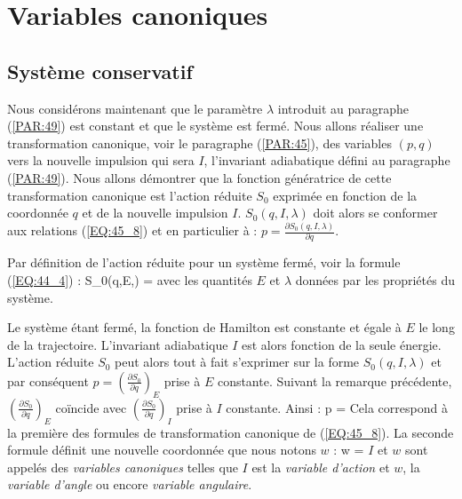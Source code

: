\section{Variables canoniques}\label{PAR:50}

\subsection{Syst\`{e}me conservatif}\label{PAR:50_1}

Nous consid\'{e}rons maintenant que le param\`{e}tre $\lambda$ introduit au paragraphe (\ref{PAR:49}) est constant et que le syst\`{e}me est ferm\'{e}. Nous allons r\'{e}aliser une transformation canonique, voir le paragraphe (\ref{PAR:45}), des variables $(p,q)$ vers la nouvelle impulsion qui sera $I$, l'invariant adiabatique d\'{e}fini au paragraphe (\ref{PAR:49}). Nous allons d\'{e}montrer que la fonction g\'{e}n\'{e}ratrice de cette transformation canonique est l'action r\'{e}duite $S_{0}$ exprim\'{e}e en fonction de la coordonn\'{e}e $q$ et de la nouvelle impulsion $I$. $S_{0}(q,I,\lambda)$ doit alors se conformer aux relations (\ref{EQ:45_8}) et en particulier \`{a} : $p = \frac{\partial S_{0}(q,I,\lambda)}{\partial q}$.

Par d\'{e}finition de l'action r\'{e}duite pour un syst\`{e}me ferm\'{e}, voir la formule (\ref{EQ:44_4}) :
\be
	S_{0}(q,E,\lambda) =  \label{EQ:50_1}
\ee
avec les quantit\'{e}s $E$ et $\lambda$ donn\'{e}es par les propri\'{e}t\'{e}s du syst\`{e}me.

Le syst\`{e}me \'{e}tant ferm\'{e}, la fonction de Hamilton est constante et \'{e}gale \`{a} $E$ le long de la trajectoire. L'invariant adiabatique $I$ est alors fonction de la seule \'{e}nergie. L'action r\'{e}duite $S_{0}$ peut alors tout \`{a} fait s'exprimer sur la forme $S_{0}(q,I,\lambda)$ et par cons\'{e}quent $p = \left(\frac{\partial S_{0}}{\partial q}\right)_{E}$ prise \`{a} $E$ constante. Suivant la remarque pr\'{e}c\'{e}dente, $\left(\frac{\partial S_{0}}{\partial q}\right)_{E}$ co\"{i}ncide avec $\left(\frac{\partial S_{0}}{\partial q}\right)_{I}$ prise \`{a} $I$ constante. Ainsi :
\be
	p =  \label{EQ:50_2}
\ee
Cela correspond \`{a} la premi\`{e}re des formules de transformation canonique de (\ref{EQ:45_8}). La seconde formule d\'{e}finit une nouvelle coordonn\'{e}e que nous notons $w$ :
\be
	w =  \label{EQ:50_3}
\ee
$I$ et $w$ sont appel\'{e}s des \emph{variables canoniques} telles que $I$ est la \emph{variable d'action} et $w$, la \emph{variable d'angle} ou encore \emph{variable angulaire}.

